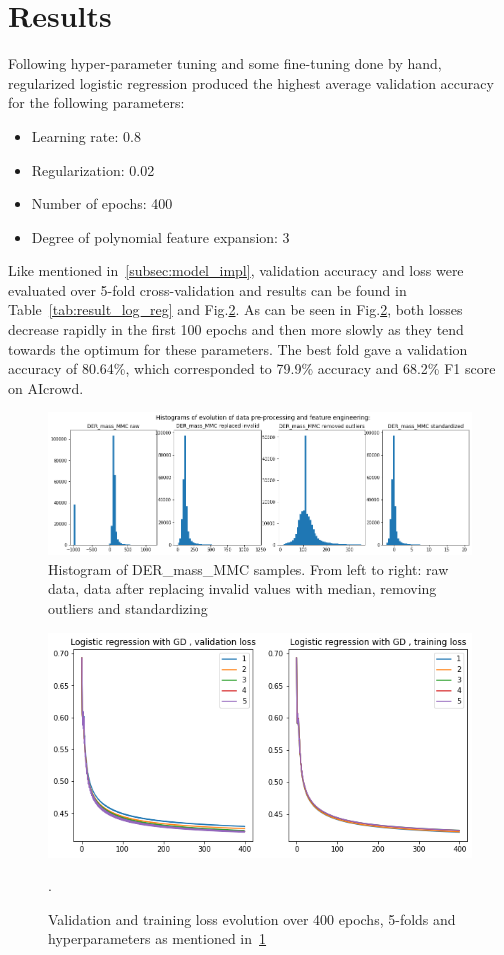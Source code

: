 \documentclass[10pt,conference,compsocconf]{IEEEtran}
\begin{document}
\section{Results}\label{sec: results}
Following hyper-parameter tuning and some fine-tuning done by hand, regularized logistic regression produced the highest average validation accuracy for the following parameters: 
\begin{itemize}
    \item Learning rate: 0.8
    \item Regularization: 0.02
    \item Number of epochs: 400
    \item Degree of polynomial feature expansion: 3
\end{itemize}
Like mentioned in~\ref{subsec:model_impl}, validation accuracy and loss were evaluated over 5-fold cross-validation and results can be found in Table~\ref{tab:result_log_reg} and Fig.\ref{fig:train_val_lr}. As can be seen in Fig.\ref{fig:train_val_lr}, both losses decrease rapidly in the first 100 epochs and then more slowly as they tend towards the optimum for these parameters. The best fold gave a validation accuracy of 80.64\%, which corresponded to 79.9\% accuracy and 68.2\% F1 score on AIcrowd. 
\begin{figure}
  \centering
  \includegraphics[width=\columnwidth]{report/example_pre_procs.png}
  \caption{Histogram of DER\_mass\_MMC samples. From left to right: raw data, data after replacing invalid values with median, removing outliers and standardizing}
  \vspace{-3mm}
  \label{fig:example_pre_procs}
\end{figure}

\begin{figure}
  \centering
  \includegraphics[width=\columnwidth]{report/train_val_loss.png}
  \caption{Validation and training loss evolution over 400 epochs, 5-folds and hyperparameters as mentioned in~\ref{sec: results}}.
  \vspace{-3mm}
  \label{fig:train_val_lr}
\end{figure}
\end{document}
